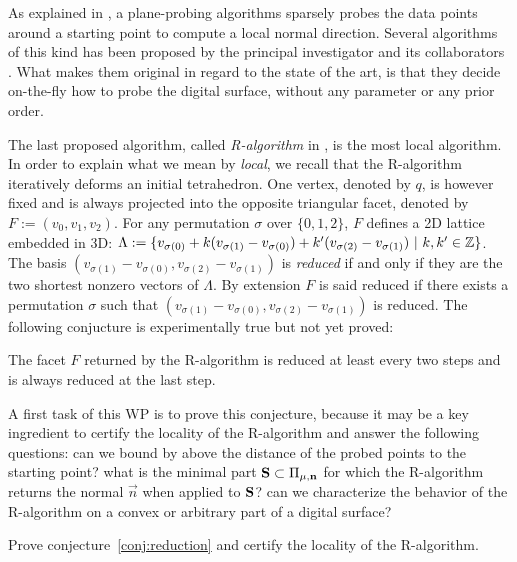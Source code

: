 As explained in , a plane-probing algorithms sparsely probes the data points
around a starting point to compute a local normal direction. Several algorithms of this kind
has been proposed by the principal investigator and its collaborators
\cite{LPRTCS2016, LPRDGCI2016, LPRJMIV2017}.
What makes them original in regard to the state of the art, is that they decide on-the-fly
how to probe the digital surface, without any parameter or any prior order.

The last proposed algorithm, called \emph{R-algorithm} in \cite{LPRJMIV2017}, is the most
local algorithm. In order to explain what we mean by \emph{local}, we recall that
the R-algorithm iteratively deforms an initial tetrahedron. One vertex, denoted by $q$,
is however fixed and is always projected into the opposite triangular facet, denoted by
$F := (v_0,v_1,v_2)$. For any permutation $\sigma$ over $\{0,1,2\}$, $F$ defines a 2D
lattice embedded in 3D:
$\Lambda := \{ v_{\sigma(0)} + k (v_{\sigma(1)}-v_{\sigma(0)}) + k' (v_{\sigma(2)}-v_{\sigma(1)}) \ | \ k,k' \in {\ensuremath\mathbb{Z}} \}$. 
The basis $(v_{\sigma(1)}-v_{\sigma(0)}, v_{\sigma(2)}-v_{\sigma(1)})$ is \emph{reduced} if and only
if they are the two shortest nonzero vectors of $\Lambda$. By extension $F$ is said reduced
if there exists a permutation $\sigma$ such that $(v_{\sigma(1)}-v_{\sigma(0)}, v_{\sigma(2)}-v_{\sigma(1)})$
is reduced. The following conjucture is experimentally true but not yet proved:

\begin{Conjecture}
  \label{conj:reduction}
  The facet $F$ returned by the R-algorithm is reduced at least every two steps and
  is always reduced at the last step.  
\end{Conjecture}

A first task of this WP is to prove this conjecture, because it may be
a key ingredient to certify the locality of the R-algorithm and answer
the following questions: can we bound by above the distance of the probed
points to the starting point? 
what is the minimal part $\mathbf{S} \subset \Pi_{\mu,\mathbf{n}}$ for which the
R-algorithm returns the normal $\vec{n}$ when applied to $\mathbf{S}$?
can we characterize the behavior of the R-algorithm on a convex or arbitrary
part of a digital surface?

\begin{Task}
  \label{task:reduction}
  Prove conjecture~\ref{conj:reduction} and certify the locality of the R-algorithm. 
\end{Task}

